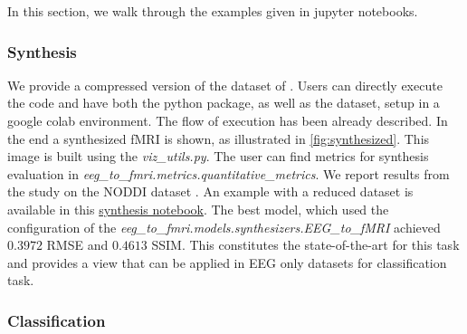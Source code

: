 In this section, we walk through the examples given in jupyter notebooks.

\subsubsection{Synthesis}\label{section:synthesis}


We provide a compressed version of the dataset of \citep{dataset2014noddi}. Users can directly execute the code and have both the python package, as well as the dataset, setup in a google colab environment. The flow of execution has been already described. In the end a synthesized fMRI is shown, as illustrated in \autoref{fig:synthesized}. This image is built using the \textit{viz\_utils.py}. The user can find metrics for synthesis evaluation in \textit{eeg\_to\_fmri.metrics.quantitative\_metrics}. We report results from the \citep{calhas2022eeg} study on the NODDI dataset \citep{dataset2014noddi}. An example with a reduced dataset is available in this \href{https://github.com/eeg-to-fmri/eeg-to-fmri/blob/main/examples/synthesis.ipynb}{synthesis notebook}. The best model, which used the configuration of the \textit{eeg\_to\_fmri.models.synthesizers.EEG\_to\_fMRI} achieved $0.3972$  RMSE and $0.4613$ SSIM. This constitutes the state-of-the-art for this task and provides a view that can be applied in EEG only datasets for classification task.

\subsubsection{Classification}\label{section:classification}

